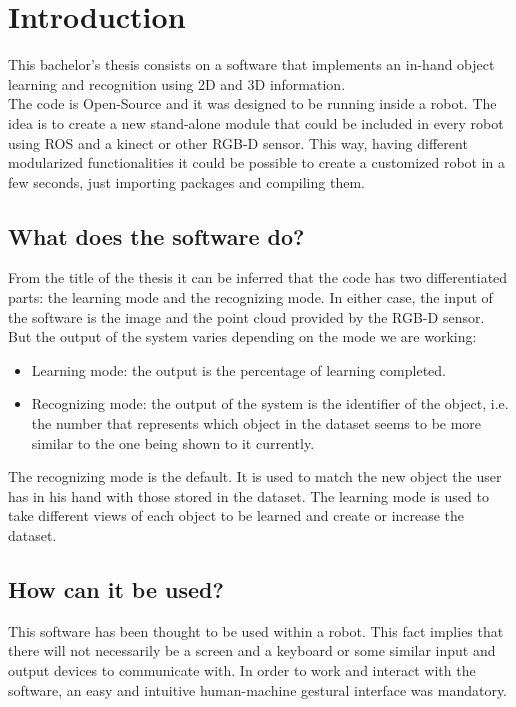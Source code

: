 \chapter{Introduction}
This bachelor's thesis consists on a software that implements an in-hand object learning and recognition using 2D and 3D information. 
\\

The code is Open-Source and it was designed to be running inside a robot. The idea is to create a new stand-alone module that could be included in every robot using ROS and a kinect or other RGB-D sensor. This way, having different modularized functionalities it could be possible to create a customized robot in a few seconds, just importing packages and compiling them. 
\\

\section{What does the software do?}
From the title of the thesis it can be inferred that the code has two differentiated parts: the learning mode and the recognizing mode. In either case, the input of the software is the image and the point cloud provided by the RGB-D sensor. 
But the output of the system varies depending on the mode we are working: 
\\
\begin{itemize}
	\item 	Learning mode:  the output is the percentage of learning completed. 
	\item   Recognizing mode: the output of the system is the identifier of the object, i.e. the number that represents which object in the dataset seems to be more similar to the one being shown to it currently. 
\end{itemize}

The recognizing mode is the default. It is used to match the new object the user has in his hand with those stored in the dataset. 
The learning mode is used to take different views of each object to be learned and create or increase the dataset. 


\section{How can it be used?}
This software has been thought to be used within a robot. This fact implies that there will not necessarily be a screen and a keyboard or some similar input and output devices to communicate with. In order to work and interact with the software, an easy and intuitive human-machine gestural interface was mandatory.  
\\

